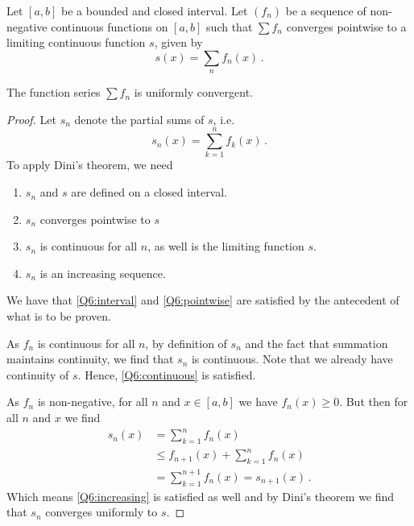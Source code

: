 \documentclass[week=6]{homework}
\begin{document}
\begin{questions}
	    \question
	    Let $[a,b]$ be a bounded and closed interval. Let $(f_n)$ be a sequence of non-negative continuous functions on $[a,b]$ such that $\sum f_n$ converges pointwise to a limiting continuous function $s$, given by
	    \[
		    s(x) = \sum_n f_n(x)\,.
	    \]
	    \begin{toprove}
	    	The function series $\sum f_n$ is uniformly convergent.
	    \end{toprove}
	    \begin{proof}
	    	Let $s_n$ denote the partial sums of $s$, i.e.
	    	\[
	    	s_n(x) = \sum_{k=1}^{n} f_k(x)\,.
	    	\]
	    	To apply Dini's theorem, we need
	    	\begin{enumerate}
	    		\item \label{Q6:interval} $s_n$ and $s$ are defined on a closed interval.
	    		\item \label{Q6:pointwise} $s_n$ converges pointwise to $s$
	    		\item \label{Q6:continuous} $s_n$ is continuous for all $n$, as well is the limiting function $s$.
	    		\item \label{Q6:increasing} $s_n$ is an increasing sequence.
	    	\end{enumerate}
	    	We have that \ref{Q6:interval} and \ref{Q6:pointwise} are satisfied by the antecedent of what is to be proven.
	    	
	    	As $f_n$ is continuous for all $n$, by definition of $s_n$ and the fact that summation maintains continuity, we find that $s_n$ is continuous. Note that we already have continuity of $s$. Hence, \ref{Q6:continuous} is satisfied.
	    	
	    	As $f_n$ is non-negative, for all $n$ and $x \in [a,b]$ we have $f_n(x) \geq 0$. But then for all $n$ and $x$ we find
	    	\begin{align*}
	    	s_n(x) &= \sum_{k=1}^{n} f_n(x) \\
	    	&\leq f_{n+1}(x) + \sum_{k=1}^{n} f_n(x) \\
	    	&= \sum_{k=1}^{n+1} f_n(x) = s_{n+1}(x)\,.
	    	\end{align*}
	    	Which means \ref{Q6:increasing} is satisfied as well and by Dini's theorem we find that $s_n$ converges uniformly to $s$.
	    \end{proof}
     \end{questions}
\end{document}
